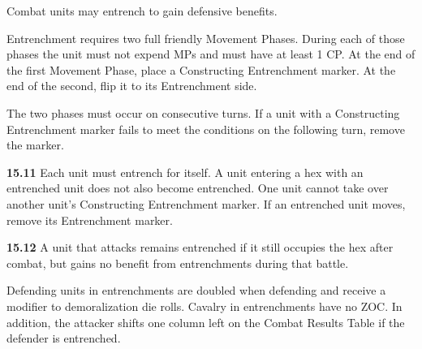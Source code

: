 
Combat units may entrench to gain defensive benefits.


Entrenchment requires two full friendly Movement Phases. During each of those phases the unit must not expend MPs and must have at least 1 CP. At the end of the first Movement Phase, place a Constructing Entrenchment marker. At the end of the second, flip it to its Entrenchment side.

The two phases must occur on consecutive turns. If a unit with a Constructing Entrenchment marker fails to meet the conditions on the following turn, remove the marker.

\textbf{15.11} Each unit must entrench for itself. A unit entering a hex with an entrenched unit does not also become entrenched. One unit cannot take over another unit's Constructing Entrenchment marker. If an entrenched unit moves, remove its Entrenchment marker.

\textbf{15.12} A unit that attacks remains entrenched if it still occupies the hex after combat, but gains no benefit from entrenchments during that battle.


Defending units in entrenchments are doubled when defending and receive a modifier to demoralization die rolls. Cavalry in entrenchments have no ZOC. In addition, the attacker shifts one column left on the Combat Results Table if the defender is entrenched.
